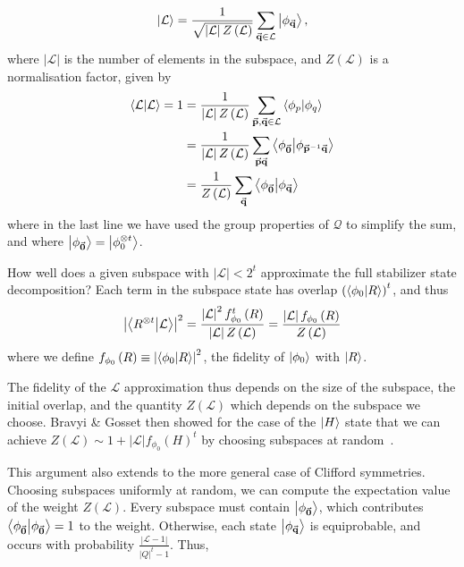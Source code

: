 \begin{equation}
\ket{\mathcal{L}} = \frac{1}{\sqrt{\left|\mathcal{L}\right|Z\left(\mathcal{L}\right)}}\sum_{\va{q}\in\mathcal{L}}\ket{\phi_{\va{q}}},
\label{eq:weight}
\end{equation}
where $\left|\mathcal{L}\right|$ is the number of elements in the subspace, and $Z\left(\mathcal{L}\right)$ is a normalisation factor, given by
\begin{align*}
\braket{\mathcal{L}}=1 &=\frac{1}{\left|\mathcal{L}\right|Z\left(\mathcal{L}\right)}\sum_{\va{p},\va{q}\in\mathcal{L}}\braket{\phi_{p}}{\phi_{q}} \nonumber \\
&=\frac{1}{\left|\mathcal{L}\right|Z\left(\mathcal{L}\right)}\sum_{\va{p}\va{q}}\braket{\phi_{\va{0}}}{\phi_{\va{p}^{-1}\va{q}}} \nonumber \\
&=\frac{1}{Z\left(\mathcal{L}\right)}\sum_{\va{q}}\braket{\phi_{\va{0}}}{\phi_{\va{q}}}
\end{align*}
where in the last line we have used the group properties of $\mathcal{Q}$ to simplify the sum, and where $\ket{\phi_{\va{0}}}=\ket{\phi_{0}^{\otimes t}}$.\par
How well does a given subspace with $\left|\mathcal{L}\right|<2^{t}$ approximate the full stabilizer state decomposition? Each term in the subspace state has overlap $\left(\braket{\phi_{0}}{R}\right)^{t}$, and thus
\begin{equation}
\left|\braket{R^{\otimes t}}{\mathcal{L}}\right|^{2}
=
\frac{\left|\mathcal{L}\right|^{2}f_{\phi_{0}}^{t}\left(R\right)}{\left|\mathcal{L}\right|Z\left(\mathcal{L}\right)}=\frac{\left|\mathcal{L}\right|f_{\phi_{0}}\left(R\right)}{Z\left(\mathcal{L}\right)}
\label{eq:incomplete_r_fidelity}
\end{equation}
where we define $f_{\phi_{0}}\left(R\right)\equiv\left|\braket{\phi_{0}}{R}\right|^{2}$, the fidelity of $\ket{\phi_{0}}$ with $\ket{R}$.\par
The fidelity of the $\mathcal{L}$ approximation thus depends on the size of the subspace, the initial overlap, and the quantity $Z\left(\mathcal{L}\right)$ which depends on the subspace we choose. Bravyi \& Gosset then showed for the case of the $\ket{H}$ state that we can achieve $Z\left(\mathcal{L}\right)\sim 1+\left|\mathcal{L}\right|f_{\phi_{0}}\left(H\right)^{t}$ by choosing subspaces at random~\cite{Bravyi2016}.\par
This argument also extends to the more general case of Clifford symmetries. Choosing subspaces uniformly at random, we can compute the expectation value of the weight $Z\left(\mathcal{L}\right)$. Every subspace must contain $\ket{\phi_{\va{0}}}$, which contributes $\braket{\phi_{\va{0}}}=1$ to the weight. Otherwise, each state $\ket{\phi_{\va{q}}}$ is equiprobable, and occurs with probability $\frac{\left|\mathcal{L}-1\right|}{\left|Q\right|^{t}-1}$. Thus,
